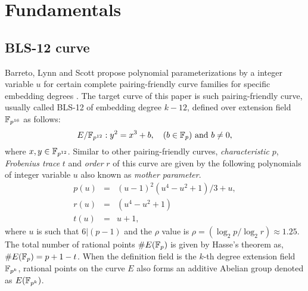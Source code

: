 \section{Fundamentals}
\subsection{BLS-12 curve}
Barreto, Lynn and Scott propose polynomial parameterizations by a integer variable $u$ for certain complete pairing-friendly curve families for specific embedding degrees \cite{SCN:BarLynSco02}. The target curve of this paper is such pairing-friendly curve, usually called BLS-12 of embedding degree $k-12$, defined over extension field $\mathbb{F}_{p^{16}}$ as follows:
\begin{equation}\label{eq:KSS_16}
E/\mathbb{F}_{p^{12}}:y^2=x^3+b, \quad \mbox{($b \in {\mathbb{F}}_{p}$) and  $b \neq 0$},
\end{equation}
 where $x,y \in \mathbb{F}_{p^{12}}$. Similar to other pairing-friendly curves,  \textit{characteristic} $p$, \textit{Frobenius trace} $t$ and \textit{order} $r$ of this curve are given by the following polynomials of  integer variable $u$ also known as \textit{mother parameter}.
\begin{subequations}
\begin{eqnarray}
p(u) &= & (u-1)^2(u^4-u^2+1)/3+u,  \\\label{eq:kss_16_char}
r(u) &= & (u^4-u^2+1)\label{eq:kss_16_degree}  \\
t(u) &=& u+1, \label{eq:kss_16_trace} 
\end{eqnarray}
\end{subequations} 
where $u$ is such that $6|(p-1)$ and the $\rho$ value is $\rho = (\log_2 p/\log_2 r) \approx 1.25$. 
The total number of rational points $\#E({\mathbb{F}}_{p})$ is given by Hasse's theorem as, $\#E({\mathbb{F}}_{p}) = p+1-t$. 
When the definition field is the $k$-th degree extension field $\mathbb{F}_{p^k}$, rational points on the curve $E$ also forms an additive Abelian group denoted as $E(\mathbb{F}_{p^k})$.

